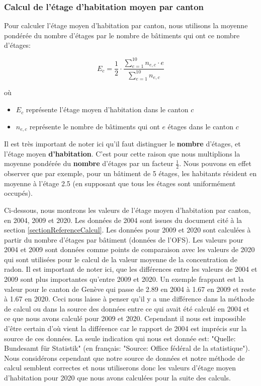\subsubsection{Calcul de l'étage d'habitation moyen par canton}\label{importationEtageMoyen}
Pour calculer l'étage moyen d'habitation par canton, nous utilisons la moyenne pondérée du nombre d'étages par le nombre de bâtiments qui ont ce nombre d'étages:

\begin{equation}
E_c = \frac{1}{2} \cdot \frac{\sum_{e=1}^{10} n_{e,c} \cdot e}{\sum_{e=1}^{10} n_{e,c}}
\end{equation}

où

\begin{itemize}
\item $E_c$ représente l'étage moyen d'habitation dans le canton $c$
\item $n_{e,c}$ représente le nombre de bâtiments qui ont $e$ étages dans le canton $c$
\end{itemize}

Il est très important de noter ici qu'il faut distinguer le \textbf{nombre} d'étages, et l'étage moyen \textbf{d'habitation}. C'est pour cette raison que nous multiplions la moyenne pondérée du \textbf{nombre} d'étages par un facteur $\frac{1}{2}$. Nous pouvons en effet observer que par exemple, pour un bâtiment de 5 étages, les habitants résident en moyenne à l'étage 2.5 (en supposant que tous les étages sont uniformément occupés).

Ci-dessous, nous montrons les valeurs de l'étage moyen d'habitation par canton, en 2004, 2009 et 2020. Les données de 2004 sont issues du document cité à la section \ref{sectionReferenceCalcul}. Les données pour 2009 et 2020 sont calculées à partir du nombre d'étages par bâtiment (données de l'OFS). Les valeurs pour 2004 et 2009 sont données comme points de comparaison avec les valeurs de 2020 qui sont utilisées pour le calcul de la valeur moyenne de la concentration de radon. 
Il est important de noter ici, que les différences entre les valeurs de 2004 et 2009 sont plus importantes qu'entre 2009 et 2020. Un exemple frappant est la valeur pour le canton de Genève qui passe de 2.89 en 2004 à 1.67 en 2009 et reste à 1.67 en 2020. Ceci nous laisse à penser qu'il y a une différence dans la méthode de calcul ou dans la source des données entre ce qui avait été calculé en 2004 et ce que nous avons calculé pour 2009 et 2020. Cependant il nous est impossible d'être certain d'où vient la différence car le rapport de 2004 est imprécis sur la source de ces données. La seule indication qui nous est donnée est: "Quelle: Bundesamt für Statistik" (en français: "Source: Office fédéral de la statistique"). 
Nous considérons cependant que notre source de données et notre méthode de calcul semblent correctes et nous utiliserons donc les valeurs d'étage moyen d'habitation pour 2020 que nous avons calculées pour la suite des calculs.
\pagebreak

